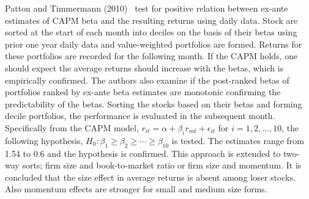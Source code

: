 Patton and Timmermann (2010)~\cite{pattim} test for positive relation between ex-ante estimates of CAPM beta and the resulting returns using daily data. Stock are sorted at the start of each month into deciles on the basis of their betas using prior one year daily data and value-weighted portfolios are formed. Returns for these portfolios are recorded for the following month. If the CAPM holds, one should expect the average returns should increase with the betas, which is empirically confirmed. The authors also examine if the post-ranked betas of portfolios ranked by ex-ante beta estimates are monotonic confirming the predictability of the betas. Sorting the stocks based on their betas and forming decile portfolios, the performance is evaluated in the subsequent month. Specifically from the CAPM model, $r_{it}= \alpha + \beta_i r_{mt} + \epsilon_{it}$ for $i=1,2,\ldots,10$, the following hypothesis, $H_0: \beta_1 \geq \beta_2 \geq \cdots \geq \beta_{10}$ is tested. The estimates range from 1.54 to 0.6 and the hypothesis is confirmed. This approach is extended to two-way sorts; firm size and book-to-market ratio or firm size and momentum. It is concluded that the size effect in average returns is absent among loser stocks. Also momentum effects are stronger for small and medium size forms. \\


